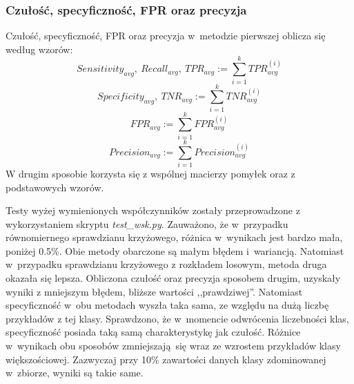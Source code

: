 \subsubsection{Czułość, specyficzność, FPR oraz precyzja}
Czułość, specyficzność, FPR oraz precyzja w~metodzie pierwszej oblicza się według wzorów:
\[Sensitivity_{avg},\ Recall_{avg},\ TPR_{avg} := \sum_{i=1}^{k} TPR_{avg}^{(i)}\]
\[Specificity_{avg},\ TNR_{avg} := \sum_{i=1}^{k} TNR_{avg}^{(i)}\]
\[FPR_{avg} := \sum_{i=1}^{k} FPR_{avg}^{(i)}\]
\[Precision_{avg} := \sum_{i=1}^{k} Precision_{avg}^{(i)}\]
W drugim sposobie korzysta się z wspólnej macierzy pomyłek oraz z podstawowych wzorów. \par
Testy wyżej wymienionych współczynników zostały przeprowadzone z wykorzystaniem skryptu \textit{test\_wsk.py}. Zauważono, że w~przypadku równomiernego sprawdzianu krzyżowego, różnica w~wynikach jest bardzo mała, poniżej 0.5\%. Obie metody obarczone są małym błędem i~wariancją. Natomiast w~przypadku sprawdzianu krzyżowego z rozkładem losowym, metoda druga okazała się lepsza. Obliczona czułość oraz precyzja sposobem drugim, uzyskały wyniki z mniejszym błędem, bliższe wartości ,,prawdziwej''. Natomiast specyficzność w~obu metodach wyszła taka sama, ze względu na dużą liczbę przykładów z tej klasy. Sprawdzono, że w~momencie odwrócenia liczebności klas, specyficzność posiada taką samą charakterystykę jak czułość. Różnice w~wynikach obu sposobów zmniejszają się wraz ze wzrostem przykładów klasy większościowej. Zazwyczaj przy 10\% zawartości danych klasy zdominowanej w~zbiorze, wyniki są takie same.
